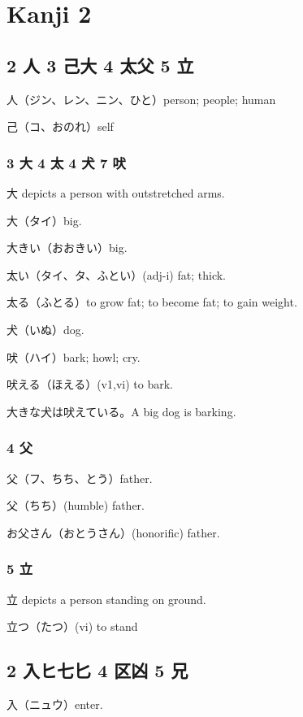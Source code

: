 \chapter{Kanji 2}

\section{2 人 3 己大 4 太父 5 立}

人（ジン、レン、ニン、ひと）person; people; human

己（コ、おのれ）self

\subsection{3 大 4 太 4 犬 7 吠}

大 depicts a person with outstretched arms.

大（タイ）big.

大きい（おおきい）big.

太い（タイ、タ、ふとい）(adj-i) fat; thick.

太る（ふとる）to grow fat; to become fat; to gain weight.

犬（いぬ）dog.

吠（ハイ）bark; howl; cry.

吠える（ほえる）(v1,vi) to bark.

大きな犬は吠えている。A big dog is barking.

\subsection{4 父}

父（フ、ちち、とう）father.

父（ちち）(humble) father.

お父さん（おとうさん）(honorific) father.

\subsection{5 立}

立 depicts a person standing on ground.

立つ（たつ）(vi) to stand

\section{2 入ヒ七匕 4 区凶 5 兄}

入（ニュウ）enter.

